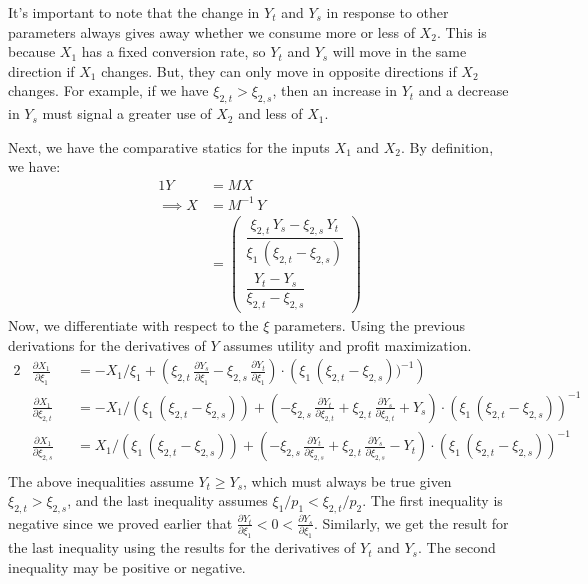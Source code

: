 \documentclass[12pt,a4paper]{extarticle}
\begin{document}
It's important to note that the change in $Y_t$ and $Y_s$ in response to other parameters always gives away whether we consume more or less of $X_2$. This is because $X_1$ has a fixed conversion rate, so $Y_t$ and $Y_s$ will move in the same direction if $X_1$ changes. But, they can only move in opposite directions if $X_2$ changes. For example, if we have $\xi_{2,t} > \xi_{2,s}$, then an increase in $Y_t$ and a decrease in $Y_s$ must signal a greater use of $X_2$ and less of $X_1$. 


Next, we have the comparative statics for the inputs $X_1$ and $X_2$. By definition, we have:
\begin{alignat*}{1}
Y &= MX \\
\implies X &= M^{-1} \, Y \\
&= \begin{pmatrix}
\dfrac{\xi _{2,t}\,Y_{s}-\xi _{2,s}\,Y_{t}}{\xi _{1}\,\left(\xi _{2,t}-\xi _{2,s}\right)}\\[2ex] 
\dfrac{Y_{t}-Y_{s}}{\xi _{2,t}-\xi _{2,s}} 
\end{pmatrix}
\end{alignat*}
Now, we differentiate with respect to the $\xi$ parameters. Using the previous derivations for the derivatives of $Y$ assumes utility and profit maximization.
\begin{alignat*}{2}
&\frac{\partial X_1}{\partial \xi_1} &&= - X_1 / \xi_1 + \left(\xi_{2,t} \, \frac{\partial Y_s}{\partial \xi_{1}} - \xi_{2,s} \, \frac{\partial Y_t}{\partial \xi_{1}} \right) \cdot \left(\xi_1 \, (\xi_{2,t} - \xi_{2,s}))^{-1} \right)  \\
&\frac{\partial X_1}{\partial \xi_{2,t}} &&= -X_1/(\xi_1 \, (\xi_{2,t} - \xi_{2,s})) + \left( - \xi_{2,s} \, \frac{\partial Y_t}{\partial \xi_{2,t}} + \xi_{2,t} \, \frac{\partial Y_s}{\partial \xi_{2,t}} + Y_s \right)\cdot(\xi_1 \, (\xi_{2,t} - \xi_{2,s}))^{-1} \\
&\frac{\partial X_1}{\partial \xi_{2,s}} &&= X_1/(\xi_1 \, (\xi_{2,t} - \xi_{2,s})) + \left( - \xi_{2,s} \, \frac{\partial Y_t}{\partial \xi_{2,s}} + \xi_{2,t} \, \frac{\partial Y_s}{\partial \xi_{2,s}} - Y_t \right)\cdot(\xi_1 \, (\xi_{2,t} - \xi_{2,s}))^{-1}  \\
\end{alignat*}
The above inequalities assume $Y_t \geq Y_s$, which must always be true given $\xi_{2,t} > \xi_{2,s}$, and the last inequality assumes $\xi_1 / p_1 < \xi_{2,t} / p_2$. The first inequality is negative since we proved earlier that $\frac{\partial Y_t}{\partial \xi_1} < 0 < \frac{\partial Y_s}{\partial \xi_1}$. Similarly, we get the result for the last inequality using the results for the derivatives of $Y_t$ and $Y_s$. The second inequality may be positive or negative. 
\end{document}
